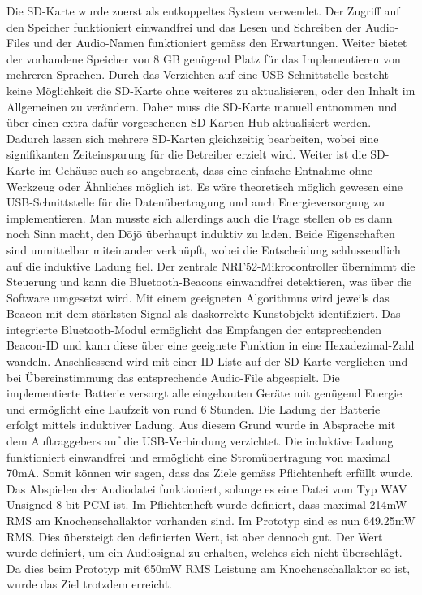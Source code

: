 Die SD-Karte wurde zuerst als entkoppeltes System verwendet. Der Zugriff auf den Speicher funktioniert einwandfrei und das Lesen und Schreiben der Audio-Files und der Audio-Namen funktioniert gemäss den Erwartungen. Weiter bietet der vorhandene Speicher von 8 GB genügend Platz für das Implementieren von mehreren Sprachen. Durch das Verzichten auf eine USB-Schnittstelle besteht keine Möglichkeit die SD-Karte ohne weiteres zu aktualisieren, oder den Inhalt im Allgemeinen zu verändern. Daher muss die SD-Karte manuell entnommen und über einen extra dafür vorgesehenen SD-Karten-Hub aktualisiert werden. Dadurch lassen sich mehrere SD-Karten gleichzeitig bearbeiten, wobei eine signifikanten Zeiteinsparung für die Betreiber erzielt wird. Weiter ist die SD-Karte im Gehäuse auch so angebracht, dass eine einfache Entnahme ohne Werkzeug oder Ähnliches möglich ist.
Es wäre theoretisch möglich gewesen eine USB-Schnittstelle für die Datenübertragung und auch Energieversorgung zu implementieren. Man musste sich allerdings auch die Frage stellen ob es dann noch Sinn macht, den Dōjō überhaupt induktiv zu laden. Beide Eigenschaften sind unmittelbar miteinander verknüpft, wobei die Entscheidung schlussendlich auf die induktive Ladung fiel. Der zentrale NRF52-Mikrocontroller übernimmt die Steuerung und kann die Bluetooth-Beacons einwandfrei detektieren, was über die Software umgesetzt wird. Mit einem geeigneten Algorithmus wird jeweils das Beacon mit dem stärksten Signal als das{\glqq korrekte\grqq} Kunstobjekt identifiziert. Das integrierte Bluetooth-Modul ermöglicht das Empfangen der entsprechenden Beacon-ID und kann diese über eine geeignete Funktion in eine Hexadezimal-Zahl wandeln. Anschliessend wird mit einer ID-Liste auf der SD-Karte verglichen und bei Übereinstimmung das entsprechende Audio-File abgespielt. Die implementierte Batterie versorgt alle eingebauten Geräte mit genügend Energie und ermöglicht eine Laufzeit von rund 6 Stunden. Die Ladung der Batterie erfolgt mittels induktiver Ladung. Aus diesem Grund wurde in Absprache mit dem Auftraggebers auf die USB-Verbindung verzichtet. Die induktive Ladung funktioniert einwandfrei und ermöglicht eine Stromübertragung von maximal 70mA. Somit können wir sagen, dass das Ziele gemäss Pflichtenheft erfüllt wurde. Das Abspielen der Audiodatei funktioniert, solange es eine Datei vom Typ WAV Unsigned 8-bit PCM ist. Im Pflichtenheft wurde definiert, dass maximal 214mW RMS am Knochenschallaktor vorhanden sind. Im Prototyp sind es nun 649.25mW RMS. Dies übersteigt den definierten Wert, ist aber dennoch gut. Der Wert wurde definiert, um ein Audiosignal zu erhalten, welches sich nicht überschlägt. Da dies beim Prototyp mit 650mW RMS Leistung am Knochenschallaktor so ist, wurde das Ziel trotzdem erreicht.
 
